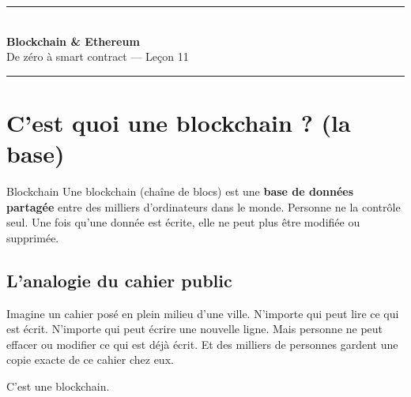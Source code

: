 \documentclass[12pt, a4paper]{article}
\begin{document}

\begin{center}
  {\color{suva_blue}\rule{\textwidth}{2pt}}\\[0.5cm]
  {\Huge\bfseries\color{suva_blue} Blockchain \& Ethereum}\\[0.3cm]
  {\large\color{gray} De zéro à smart contract --- Leçon 11}\\[0.5cm]
  {\color{suva_blue}\rule{\textwidth}{0.5pt}}
\end{center}

\tableofcontents
\newpage

\section{C'est quoi une blockchain ? (la base)}

\begin{definition}{Blockchain}
Une blockchain (chaîne de blocs) est une \textbf{base de données partagée} entre des milliers
d'ordinateurs dans le monde. Personne ne la contrôle seul. Une fois qu'une donnée est écrite,
elle ne peut plus être modifiée ou supprimée.
\end{definition}

\subsection{L'analogie du cahier public}

Imagine un cahier posé en plein milieu d'une ville. N'importe qui peut lire ce qui est écrit.
N'importe qui peut écrire une nouvelle ligne. Mais personne ne peut effacer ou modifier ce qui
est déjà écrit. Et des milliers de personnes gardent une copie exacte de ce cahier chez eux.

C'est une blockchain.

\begin{center}
\end{center}
\end{document}
